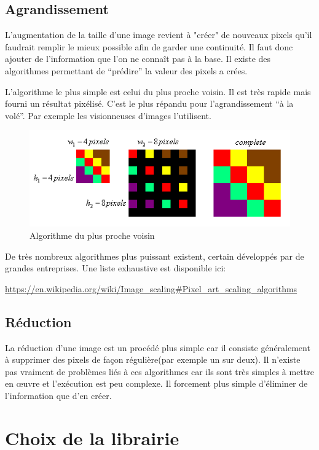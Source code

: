 \documentclass[12pt, a4paper]{article}
\begin{document}
\subsection{Agrandissement}
 
L'augmentation de la taille d'une image revient à "créer" de nouveaux pixels qu'il faudrait remplir le mieux possible afin de garder une continuité. Il faut donc ajouter de l'information que l'on ne connaît pas à la base. Il existe des algorithmes permettant de ``prédire'' la valeur des pixels a crées.

L'algorithme le plus simple est celui du plus proche voisin. Il est très rapide mais fourni un résultat pixélisé. C'est le plus répandu pour l'agrandissement ``à la volé''. Par exemple les visionneuses d'images l'utilisent.

\begin{figure}[h!]
  \centering
  \includegraphics[scale=0.6]{Images/plus_proche_voisin.png}
  \caption{Algorithme du plus proche voisin}
\end{figure}

De très nombreux algorithmes plus puissant existent, certain développés par de grandes entreprises. Une liste exhaustive est disponible ici:

\url{https://en.wikipedia.org/wiki/Image_scaling#Pixel_art_scaling_algorithms}

\subsection{Réduction}

La réduction d'une image est un procédé plus simple car il consiste généralement à supprimer des pixels de façon régulière(par exemple un sur deux). Il n'existe pas vraiment de problèmes liés à ces algorithmes car ils sont très simples à mettre en œuvre et l'exécution est peu complexe. Il forcement plus simple d'éliminer de l'information que d'en créer.


\section{Choix de la librairie}
\end{document}
